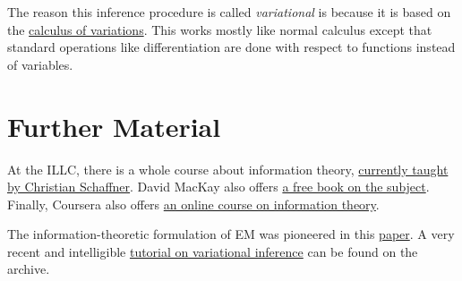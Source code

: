 \documentclass[a4paper,11pt,leqno]{report}\usepackage[]{graphicx}\usepackage[]{color}
\begin{document}
The reason this inference procedure is called \textit{variational} is because it is based on the 
\href{https://en.wikipedia.org/wiki/Calculus_of_variations}{calculus of variations}. This works mostly
like normal calculus except that standard operations like differentiation are done with respect to functions
instead of variables.




\section*{Further Material}

At the ILLC, there is a whole course about information theory, \href{http://homepages.cwi.nl/~schaffne/courses/inftheory/}{currently taught by Christian Schaffner}. David MacKay also offers \href{http://www.inference.phy.cam.ac.uk/itprnn/book.pdf}{a free book on the subject}. Finally,
Coursera also offers \href{https://www.coursera.org/course/informationtheory}{an online course on information theory}.

The information-theoretic formulation of EM was pioneered in this \href{http://www.cs.toronto.edu/~fritz/absps/emk.pdf}{paper}. A very recent and intelligible 
\href{https://arxiv.org/abs/1601.00670}{tutorial on variational inference} can be found on the archive.
\end{document}
